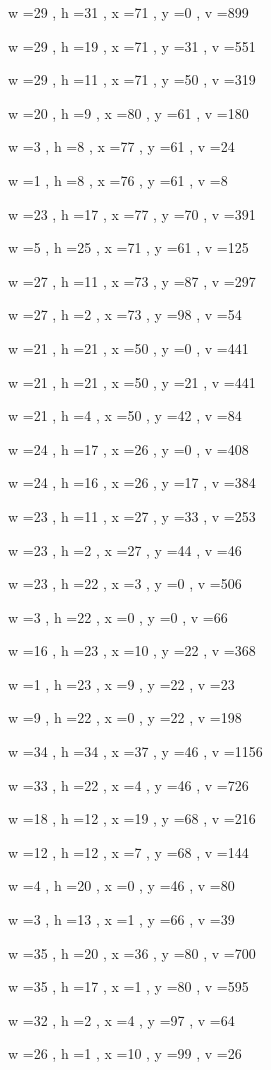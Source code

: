 \documentclass[11pt]{article}
\begin{document}
w =29 , h =31 , x =71 , y =0 , v =899
\par
w =29 , h =19 , x =71 , y =31 , v =551
\par
w =29 , h =11 , x =71 , y =50 , v =319
\par
w =20 , h =9 , x =80 , y =61 , v =180
\par
w =3 , h =8 , x =77 , y =61 , v =24
\par
w =1 , h =8 , x =76 , y =61 , v =8
\par
w =23 , h =17 , x =77 , y =70 , v =391
\par
w =5 , h =25 , x =71 , y =61 , v =125
\par
w =27 , h =11 , x =73 , y =87 , v =297
\par
w =27 , h =2 , x =73 , y =98 , v =54
\par
w =21 , h =21 , x =50 , y =0 , v =441
\par
w =21 , h =21 , x =50 , y =21 , v =441
\par
w =21 , h =4 , x =50 , y =42 , v =84
\par
w =24 , h =17 , x =26 , y =0 , v =408
\par
w =24 , h =16 , x =26 , y =17 , v =384
\par
w =23 , h =11 , x =27 , y =33 , v =253
\par
w =23 , h =2 , x =27 , y =44 , v =46
\par
w =23 , h =22 , x =3 , y =0 , v =506
\par
w =3 , h =22 , x =0 , y =0 , v =66
\par
w =16 , h =23 , x =10 , y =22 , v =368
\par
w =1 , h =23 , x =9 , y =22 , v =23
\par
w =9 , h =22 , x =0 , y =22 , v =198
\par
w =34 , h =34 , x =37 , y =46 , v =1156
\par
w =33 , h =22 , x =4 , y =46 , v =726
\par
w =18 , h =12 , x =19 , y =68 , v =216
\par
w =12 , h =12 , x =7 , y =68 , v =144
\par
w =4 , h =20 , x =0 , y =46 , v =80
\par
w =3 , h =13 , x =1 , y =66 , v =39
\par
w =35 , h =20 , x =36 , y =80 , v =700
\par
w =35 , h =17 , x =1 , y =80 , v =595
\par
w =32 , h =2 , x =4 , y =97 , v =64
\par
w =26 , h =1 , x =10 , y =99 , v =26
\par
\newpage
\end{document}
